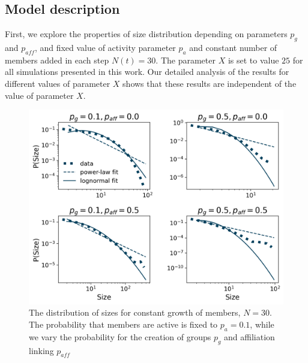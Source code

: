 \subsection{Model description}
First, we explore the properties of size distribution depending on parameters $p_{g}$ and $p_{aff}$, and fixed value of activity parameter $p_{a}$ and constant number of members added in each step $N(t)=30$. The parameter $X$ is set to value $25$ for all simulations presented in this work. Our detailed analysis of the results for different values of parameter $X$ shows that these results are independent of the value of parameter $X$.

\begin{figure}
	\centering
	\includegraphics[scale=0.5]{Figures/figures/Fig5.png}
	\caption{The distribution of sizes for constant growth of members, $N=30$. The probability that members are active is fixed to $p_a = 0.1$, while we vary the probability for the creation of groups $p_g$ and affiliation linking $p_{aff}$}
	\label{fig:n30}
\end{figure}


